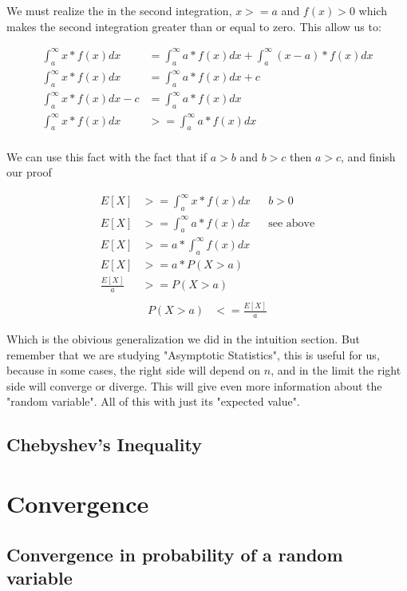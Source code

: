\documentclass[10pt,a4paper]{book}
\begin{document}
We must realize the in the second integration, $x>=a$ and $f(x) > 0$ which makes the second integration greater than or equal to zero. This allow us to:

\begin{align*}
	\int_{a}^{\infty}{x*f(x)dx} &=\int_{a}^{\infty}{a*f(x)dx}+\int_{a}^{\infty}{(x-a)*f(x)dx}\\
	\int_{a}^{\infty}{x*f(x)dx}	&=\int_{a}^{\infty}{a*f(x)dx}+c\\
	\int_{a}^{\infty}{x*f(x)dx}	- c &=\int_{a}^{\infty}{a*f(x)dx}\\
	\int_{a}^{\infty}{x*f(x)dx}	&>= \int_{a}^{\infty}{a*f(x)dx}\\	
\end{align*}

We can use this fact with the fact that if $a>b$ and $b>c$ then $a>c$, and finish our proof

\begin{align*}
	E[X] &>= \int_{a}^{\infty}{x*f(x)dx} && b > 0\\
	E[X] &>= \int_{a}^{\infty}{a*f(x)dx} && \text{see above}\\
	E[X] &>= a*\int_{a}^{\infty}{f(x)dx}\\
	E[X] &>= a*P(X>a)\\
	\frac{E[X]}{a} &>= P(X>a)\\
\end{align*}
\begin{align}
	P(X>a) &<= \frac{E[X]}{a}	
\end{align}

Which is the obivious generalization we did in the intuition section. But remember that we are studying "Asymptotic Statistics", this is useful for us, because in some cases, the right side will depend on $n$, and in the limit the right side will converge or diverge. This will give even more information about the "random variable". All of this with just its "expected value".
		
	\section{Chebyshev's Inequality}

	\chapter{Convergence}
	\section{Convergence in probability of a random variable}
\end{document}
